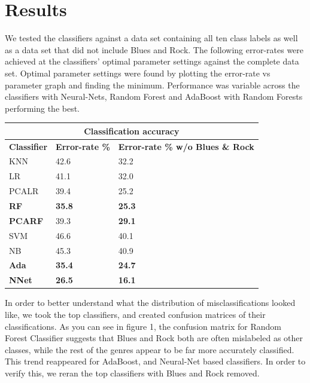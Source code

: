 \documentclass{article} %
\begin{document}
\section{Results}
We tested the classifiers against a data set containing all ten class labels as well as a data set that did not include Blues and Rock. The following error-rates were achieved at the classifiers' optimal parameter settings against the complete data set. Optimal parameter settings were found by plotting the error-rate vs parameter graph and finding the minimum.  Performance was variable across the classifiers with Neural-Nets, Random Forest and AdaBoost with Random Forests performing the best. \newline
\begin{center}
	\begin{tabular}{ |p{2cm}|p{2.3cm}|p{2.3cm}|}
		\hline
		\multicolumn{3}{|c|}{\textbf{Classification accuracy}} \\
		\hline
		\textbf{Classifier} & \textbf{Error-rate \%} & \textbf{Error-rate \% w/o Blues \& Rock} \\
		\hline
		KNN & 42.6 & 32.2\\
		LR & 41.1  & 32.0 \\
		PCALR & 39.4 & 25.2\\
		\textbf{RF}    &  \textbf{35.8}  & \textbf{25.3}\\
		\textbf{PCARF} & 39.3 & \textbf{29.1}\\
		SVM & 46.6 & 40.1 \\
		NB & 45.3 & 40.9 \\
		\textbf{Ada} & \textbf{35.4} & \textbf{24.7}\\
		\textbf{NNet} & \textbf{26.5} & \textbf{16.1}\\
		\hline
	\end{tabular}
\end{center}
In order to better understand what the distribution of misclassifications looked like, we took the top classifiers, and created confusion matrices of their classifications. As you can see in figure 1, the confusion matrix for Random Forest Classifier suggests that Blues and Rock both are often mislabeled as other classes, while the rest of the genres appear to be far more accurately classified. This trend reappeared for AdaBoost, and Neural-Net based classifiers. In order to verify this, we reran the top classifiers with Blues and Rock removed.
\end{document}
